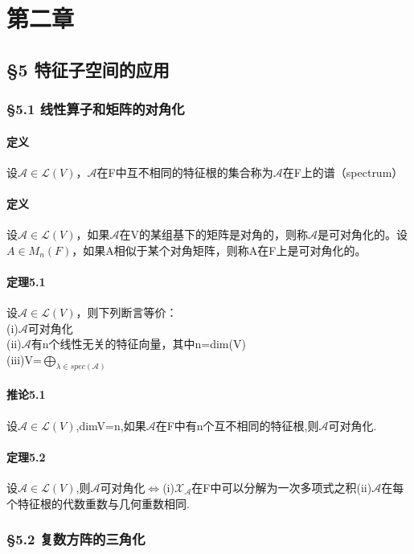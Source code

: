 \documentclass{ctexart}
\begin{document}
\section{第二章}
\subsection{§5 特征子空间的应用}
\subsubsection{§5.1 线性算子和矩阵的对角化}
\paragraph{定义}
设$\mathcal{A}\in\mathcal{L}(V)$，$\mathcal{A}$在F中互不相同的特征根的集合称为$\mathcal{A}$在F上的谱（spectrum）
\paragraph{定义}
设$\mathcal{A}\in\mathcal{L}(V)$，如果$\mathcal{A}$在V的某组基下的矩阵是对角的，则称$\mathcal{A}$是可对角化的。设$A \in M_{n}(F)$，如果A相似于某个对角矩阵，则称A在F上是可对角化的。
\paragraph{定理5.1}
设$\mathcal{A}\in \mathcal{L}(V)$，则下列断言等价：\\
(i)$\mathcal{A}$可对角化\\
(ii)$\mathcal{A}$有n个线性无关的特征向量，其中n=dim(V)\\
(iii)V=$\bigoplus_{\lambda \in spec(\mathcal{A})}$\\
\paragraph{推论5.1}
设$\mathcal{A}\in\mathcal{L}(V)$,dimV=n,如果$\mathcal{A}$在F中有n个互不相同的特征根,则$\mathcal{A}$可对角化.
\paragraph{定理5.2}
设$\mathcal{A}\in\mathcal{L}(V)$,则$\mathcal{A}$可对角化$\Leftrightarrow$(i)$\mathcal{X}_{\mathcal{A}}$在F中可以分解为一次多项式之积(ii)$\mathcal{A}$在每个特征根的代数重数与几何重数相同.
\subsubsection{§5.2 复数方阵的三角化}
\end{document}
